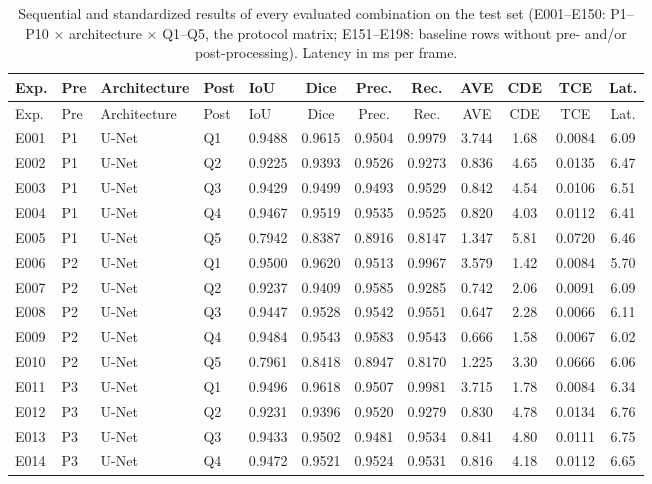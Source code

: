 \begingroup\scriptsize
\setlength{\tabcolsep}{3.5pt}
\begin{longtable}{@{}lllllccccccc@{}}
\caption{Sequential and standardized results of every evaluated combination on the test set (E001--E150: P1--P10 $\times$ architecture $\times$ Q1--Q5, the protocol matrix; E151--E198: baseline rows without pre- and/or post-processing). Latency in ms per frame.}\label{tab:sequential}\\
\toprule
Exp. & Pre & Architecture & Post & IoU & Dice & Prec. & Rec. & AVE & CDE & TCE & Lat. \\
\midrule
\endfirsthead
\toprule
Exp. & Pre & Architecture & Post & IoU & Dice & Prec. & Rec. & AVE & CDE & TCE & Lat. \\
\midrule
\endhead
\bottomrule
\endfoot
E001 & P1 & U-Net & Q1 & 0.9488 & 0.9615 & 0.9504 & 0.9979 & 3.744 & 1.68 & 0.0084 & 6.09 \\
E002 & P1 & U-Net & Q2 & 0.9225 & 0.9393 & 0.9526 & 0.9273 & 0.836 & 4.65 & 0.0135 & 6.47 \\
E003 & P1 & U-Net & Q3 & 0.9429 & 0.9499 & 0.9493 & 0.9529 & 0.842 & 4.54 & 0.0106 & 6.51 \\
E004 & P1 & U-Net & Q4 & 0.9467 & 0.9519 & 0.9535 & 0.9525 & 0.820 & 4.03 & 0.0112 & 6.41 \\
E005 & P1 & U-Net & Q5 & 0.7942 & 0.8387 & 0.8916 & 0.8147 & 1.347 & 5.81 & 0.0720 & 6.46 \\
E006 & P2 & U-Net & Q1 & 0.9500 & 0.9620 & 0.9513 & 0.9967 & 3.579 & 1.42 & 0.0084 & 5.70 \\
E007 & P2 & U-Net & Q2 & 0.9237 & 0.9409 & 0.9585 & 0.9285 & 0.742 & 2.06 & 0.0091 & 6.09 \\
E008 & P2 & U-Net & Q3 & 0.9447 & 0.9528 & 0.9542 & 0.9551 & 0.647 & 2.28 & 0.0066 & 6.11 \\
E009 & P2 & U-Net & Q4 & 0.9484 & 0.9543 & 0.9583 & 0.9543 & 0.666 & 1.58 & 0.0067 & 6.02 \\
E010 & P2 & U-Net & Q5 & 0.7961 & 0.8418 & 0.8947 & 0.8170 & 1.225 & 3.30 & 0.0666 & 6.06 \\
E011 & P3 & U-Net & Q1 & 0.9496 & 0.9618 & 0.9507 & 0.9981 & 3.715 & 1.78 & 0.0084 & 6.34 \\
E012 & P3 & U-Net & Q2 & 0.9231 & 0.9396 & 0.9520 & 0.9279 & 0.830 & 4.78 & 0.0134 & 6.76 \\
E013 & P3 & U-Net & Q3 & 0.9433 & 0.9502 & 0.9481 & 0.9534 & 0.841 & 4.80 & 0.0111 & 6.75 \\
E014 & P3 & U-Net & Q4 & 0.9472 & 0.9521 & 0.9524 & 0.9531 & 0.816 & 4.18 & 0.0112 & 6.65 \\

\end{longtable}
